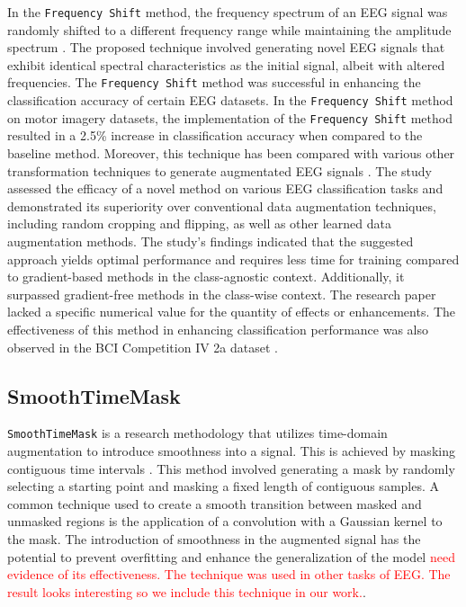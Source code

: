 \documentclass[runningheads]{llncs}
\begin{document}
In the \texttt{Frequency Shift} method, the frequency spectrum of an EEG signal was randomly shifted to a different frequency range while maintaining the amplitude spectrum \cite{rommel2022data}. The proposed technique involved generating novel EEG signals that exhibit identical spectral characteristics as the initial signal, albeit with altered frequencies.  The \texttt{Frequency Shift} method was successful in enhancing the classification accuracy of certain EEG datasets. In the \texttt{Frequency Shift} method on motor imagery datasets, the implementation of the \texttt{Frequency Shift} method resulted in a 2.5\% increase in classification accuracy when compared to the baseline method. Moreover, this technique has been compared with various other transformation techniques to generate augmentated EEG signals \cite{rommel2021cadda}. The study assessed the efficacy of a novel method on various EEG classification tasks and demonstrated its superiority over conventional data augmentation techniques, including random cropping and flipping, as well as other learned data augmentation methods. The study's findings indicated that the suggested approach yields optimal performance and requires less time for training compared to gradient-based methods in the class-agnostic context. Additionally, it surpassed gradient-free methods in the class-wise context. The research paper lacked a specific numerical value for the quantity of effects or enhancements. The effectiveness of this method in enhancing classification performance was also observed in the BCI Competition IV 2a dataset \cite{brunner2008bci}.

\subsection{SmoothTimeMask}
\texttt{SmoothTimeMask} is a research methodology that utilizes time-domain augmentation to introduce smoothness into a signal. This is achieved by masking contiguous time intervals \cite{mohsenvand2020contrastive}.  This method involved generating a mask by randomly selecting a starting point and masking a fixed length of contiguous samples. A common technique used to create a smooth transition between masked and unmasked regions is the application of a convolution with a Gaussian kernel to the mask. The introduction of smoothness in the augmented signal has the potential to prevent overfitting and enhance the generalization of the model \cite{mohsenvand2020contrastive}  \textcolor{red}{need evidence of its effectiveness. The technique was used in other tasks of EEG. The result looks interesting so we include this technique in our work.}.
\end{document}
